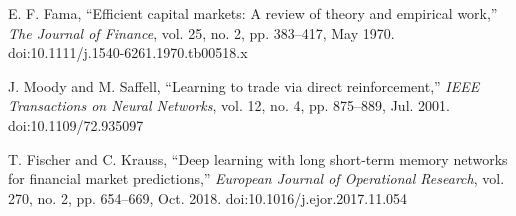 \documentclass{article}
\begin{document}
\par [4] E. F. Fama, ``Efficient capital markets: A review of theory and empirical work,'' \textit{The Journal of Finance}, vol. 25, no. 2, pp. 383--417, May 1970. doi:10.1111/j.1540-6261.1970.tb00518.x

\par [5] J. Moody and M. Saffell, ``Learning to trade via direct reinforcement,'' \textit{IEEE Transactions on Neural Networks}, vol. 12, no. 4, pp. 875--889, Jul. 2001. doi:10.1109/72.935097

\par [6] T. Fischer and C. Krauss, ``Deep learning with long short-term memory networks for financial market predictions,'' \textit{European Journal of Operational Research}, vol. 270, no. 2, pp. 654--669, Oct. 2018. doi:10.1016/j.ejor.2017.11.054
\end{document}
